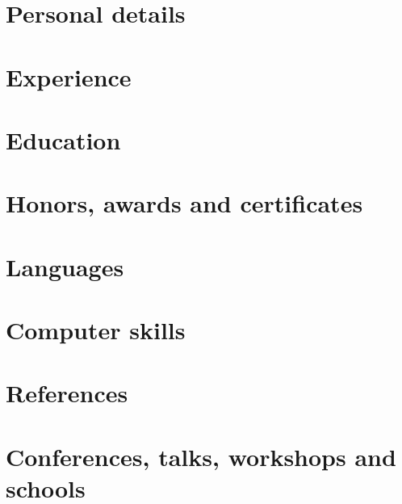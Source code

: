 \def\titlename{Curriculum vitae}




\maketitle

\section{Personal details}


\vspace{0.2cm}

\section{Experience}


\vspace{0.3cm}

\section{Education}


\section{Honors, awards and certificates}


\section{Languages}


\section{Computer skills}


\section{References}




\section{Conferences, talks, workshops and schools}



